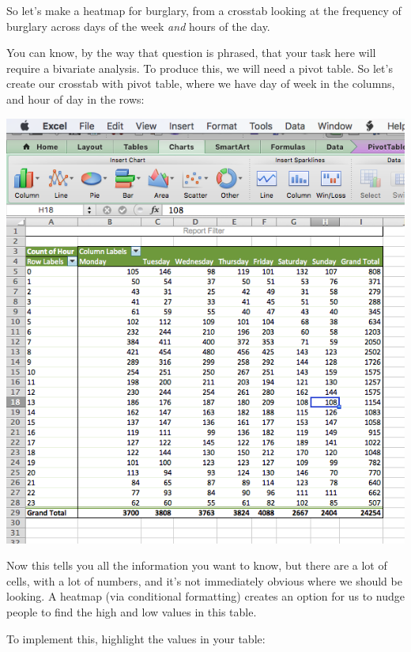 \documentclass[
]{book}
\begin{document}
So let's make a heatmap for burglary, from a crosstab looking at the frequency of burglary across days of the week \emph{and} hours of the day.

You can know, by the way that question is phrased, that your task here will require a bivariate analysis. To produce this, we will need a pivot table. So let's create our crosstab with pivot table, where we have day of week in the columns, and hour of day in the rows:

\includegraphics{imgs/hm_pivot.png}

Now this tells you all the information you want to know, but there are a lot of cells, with a lot of numbers, and it's not immediately obvious where we should be looking. A heatmap (via conditional formatting) creates an option for us to nudge people to find the high and low values in this table.

To implement this, highlight the values in your table:
\end{document}
